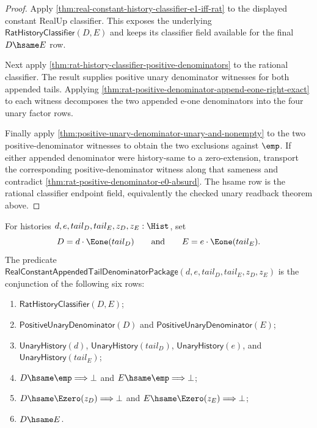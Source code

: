 \begin{proof}
Apply \autoref{thm:real-constant-history-classifier-e1-iff-rat} to the
displayed constant RealUp classifier. This exposes the underlying
$\mathsf{RatHistoryClassifier}(D,E)$ and keeps its classifier field available
for the final $D\hsame E$ row.

Next apply \autoref{thm:rat-history-classifier-positive-denominators} to the
rational classifier. The result supplies positive unary denominator witnesses
for both appended tails. Applying
\autoref{thm:rat-positive-denominator-append-eone-right-exact} to each
witness decomposes the two appended e-one denominators into the four unary
factor rows.

Finally apply \autoref{thm:positive-unary-denominator-unary-and-nonempty} to
the two positive-denominator witnesses to obtain the two exclusions against
$\emp$. If either appended denominator were history-same to a zero-extension,
transport the corresponding positive-denominator witness along that sameness
and contradict \autoref{thm:rat-positive-denominator-e0-absurd}. The hsame row
is the rational classifier endpoint field, equivalently the checked unary
readback theorem above.
\end{proof}

\begin{definition}
\label{def:real-constant-appended-tail-denominator-package}
For histories $d,e,tail_D,tail_E,z_D,z_E:\Hist$, set
$$
D=d\cdot\Eone(tail_D)
\qquad\text{and}\qquad
E=e\cdot\Eone(tail_E).
$$
The predicate
$\mathsf{RealConstantAppendedTailDenominatorPackage}(d,e,tail_D,tail_E,z_D,z_E)$
is the conjunction of the following six rows:
\begin{enumerate}
  \item $\mathsf{RatHistoryClassifier}(D,E)$;
  \item $\mathsf{PositiveUnaryDenominator}(D)$ and
  $\mathsf{PositiveUnaryDenominator}(E)$;
  \item $\mathsf{UnaryHistory}(d)$, $\mathsf{UnaryHistory}(tail_D)$,
  $\mathsf{UnaryHistory}(e)$, and $\mathsf{UnaryHistory}(tail_E)$;
  \item $D\hsame\emp\Longrightarrow\bot$ and
  $E\hsame\emp\Longrightarrow\bot$;
  \item $D\hsame\Ezero(z_D)\Longrightarrow\bot$ and
  $E\hsame\Ezero(z_E)\Longrightarrow\bot$;
  \item $D\hsame E$.
\end{enumerate}
\end{definition}


